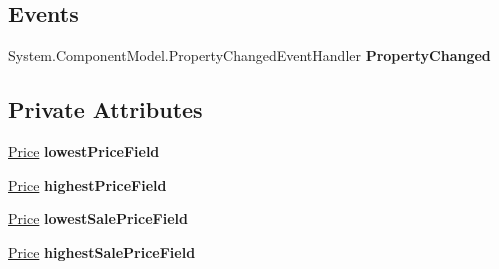 \begin{DoxyCompactItemize}
\begin{DoxyCompactList}\small\item\em \end{DoxyCompactList}\end{DoxyCompactItemize}
\subsection*{Events}
\begin{DoxyCompactItemize}
\item 
\hypertarget{class_price___comparison_1_1amazon_1_1ecs_1_1_variation_summary_ab97a4c3738ba03f3efcdd158c485709d}{System.\-Component\-Model.\-Property\-Changed\-Event\-Handler {\bfseries Property\-Changed}}\label{class_price___comparison_1_1amazon_1_1ecs_1_1_variation_summary_ab97a4c3738ba03f3efcdd158c485709d}

\end{DoxyCompactItemize}
\subsection*{Private Attributes}
\begin{DoxyCompactItemize}
\item 
\hypertarget{class_price___comparison_1_1amazon_1_1ecs_1_1_variation_summary_a9c93d737b37032e46acc7589c26e867d}{\hyperlink{class_price___comparison_1_1amazon_1_1ecs_1_1_price}{Price} {\bfseries lowest\-Price\-Field}}\label{class_price___comparison_1_1amazon_1_1ecs_1_1_variation_summary_a9c93d737b37032e46acc7589c26e867d}

\item 
\hypertarget{class_price___comparison_1_1amazon_1_1ecs_1_1_variation_summary_a305545e89530e04e9a4c1ef5f26a8c05}{\hyperlink{class_price___comparison_1_1amazon_1_1ecs_1_1_price}{Price} {\bfseries highest\-Price\-Field}}\label{class_price___comparison_1_1amazon_1_1ecs_1_1_variation_summary_a305545e89530e04e9a4c1ef5f26a8c05}

\item 
\hypertarget{class_price___comparison_1_1amazon_1_1ecs_1_1_variation_summary_a42c6b465c3de180a48133fa819cfedee}{\hyperlink{class_price___comparison_1_1amazon_1_1ecs_1_1_price}{Price} {\bfseries lowest\-Sale\-Price\-Field}}\label{class_price___comparison_1_1amazon_1_1ecs_1_1_variation_summary_a42c6b465c3de180a48133fa819cfedee}

\item 
\hypertarget{class_price___comparison_1_1amazon_1_1ecs_1_1_variation_summary_ad405c1f87b9fcc7c54518b3830b43578}{\hyperlink{class_price___comparison_1_1amazon_1_1ecs_1_1_price}{Price} {\bfseries highest\-Sale\-Price\-Field}}\label{class_price___comparison_1_1amazon_1_1ecs_1_1_variation_summary_ad405c1f87b9fcc7c54518b3830b43578}

\end{DoxyCompactItemize}


